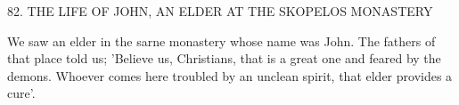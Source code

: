 82.
THE LIFE OF JOHN,
AN ELDER AT THE SKOPELOS MONASTERY

We saw an elder in the sarne monastery whose name was John.
The
fathers of that place told us; 'Believe us, Christians, that is a great
one and feared by the demons.
Whoever comes here troubled by an
unclean spirit, that elder provides a cure'.

